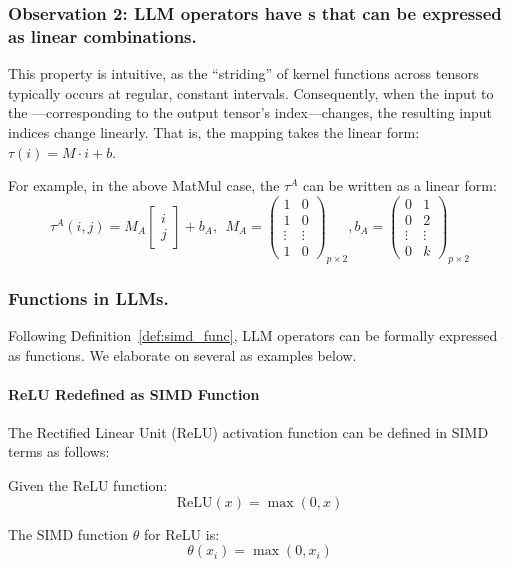 \subsubsection{Observation 2: LLM operators have \depmap{}s that can be expressed as linear combinations.}
This property is intuitive, as the ``striding'' of kernel functions across
tensors typically occurs at regular, constant intervals.
Consequently, when the input to the \depmap---corresponding to the output tensor's index---changes,
the resulting input indices change linearly.
That is, the mapping takes the linear form: $\tau(i) = M\cdot i + b$.

For example, in the above MatMul case,
the \depmap $\tau^A$ can be written as a linear form:
\[
    \tau^{A}(i,j) = M_A \begin{bmatrix} i \\ j \end{bmatrix} + b_A,\ \
  M_A = \begin{pmatrix}
    1 & 0 \\
    1 & 0 \\
    \vdots & \vdots \\
    1 & 0
  \end{pmatrix}_{p \times 2},
  b_A = \begin{pmatrix}
    0 & 1 \\
    0 & 2 \\
    \vdots & \vdots \\
    0 & k
  \end{pmatrix}_{p \times 2}
\]




\subsubsection{\simd{} Functions in LLMs.}
Following Definition~\ref{def:simd_func}, LLM operators can be formally expressed as \simd{} functions.
We elaborate on several as examples below.

\paragraph{ReLU Redefined as SIMD Function}

The Rectified Linear Unit (ReLU) activation function can be defined in SIMD terms as follows:

Given the ReLU function:
\[
\text{ReLU}(x) = \max(0, x)
\]

The SIMD function $\theta$ for ReLU is:
\[
\theta(x_i) = \max(0, x_i)
\]

